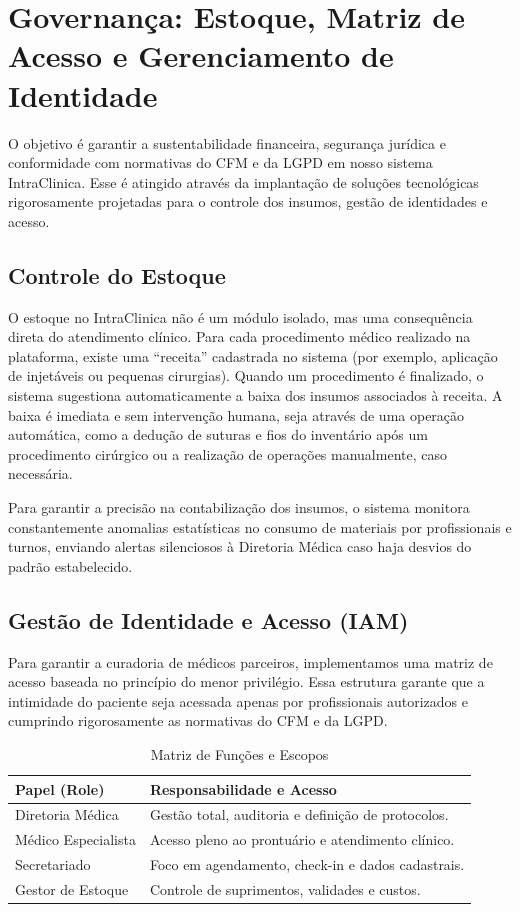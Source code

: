  \chapter{Governança: Estoque, Matriz de Acesso e Gerenciamento de Identidade}

O objetivo é garantir a sustentabilidade financeira, segurança jurídica e conformidade com normativas do CFM e da LGPD em nosso sistema IntraClinica. Esse é atingido através da implantação de soluções tecnológicas rigorosamente projetadas para o controle dos insumos, gestão de identidades e acesso.

\section{Controle do Estoque}

O estoque no IntraClinica não é um módulo isolado, mas uma consequência direta do atendimento clínico. Para cada procedimento médico realizado na plataforma, existe uma ``receita'' cadastrada no sistema (por exemplo, aplicação de injetáveis ou pequenas cirurgias). Quando um procedimento é finalizado, o sistema sugestiona automaticamente a baixa dos insumos associados à receita. A baixa é imediata e sem intervenção humana, seja através de uma operação automática, como a dedução de suturas e fios do inventário após um procedimento cirúrgico ou a realização de operações manualmente, caso necessária.

Para garantir a precisão na contabilização dos insumos, o sistema monitora constantemente anomalias estatísticas no consumo de materiais por profissionais e turnos, enviando alertas silenciosos à Diretoria Médica caso haja desvios do padrão estabelecido.

\section{Gestão de Identidade e Acesso (IAM)}

Para garantir a curadoria de médicos parceiros, implementamos uma matriz de acesso baseada no princípio do menor privilégio. Essa estrutura garante que a intimidade do paciente seja acessada apenas por profissionais autorizados e cumprindo rigorosamente as normativas do CFM e da LGPD.

\begin{table}[h!]
\centering
\caption{Matriz de Funções e Escopos}
\vspace{0.3cm}
\begin{tabular}{@{}ll@{}}
\toprule
\textbf{Papel (Role)} & \textbf{Responsabilidade e Acesso} \\ \midrule
Diretoria Médica & Gestão total, auditoria e definição de protocolos. \\
Médico Especialista & Acesso pleno ao prontuário e atendimento clínico. \\
Secretariado & Foco em agendamento, check-in e dados cadastrais. \\
Gestor de Estoque & Controle de suprimentos, validades e custos. \\ \bottomrule
\end{tabular}
\end{table}


